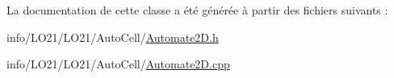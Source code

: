 La documentation de cette classe a été générée à partir des fichiers suivants \+:\begin{DoxyCompactItemize}
\item 
info/\+L\+O21/\+L\+O21/\+Auto\+Cell/\hyperlink{_automate2_d_8h}{Automate2\+D.\+h}\item 
info/\+L\+O21/\+L\+O21/\+Auto\+Cell/\hyperlink{_automate2_d_8cpp}{Automate2\+D.\+cpp}\end{DoxyCompactItemize}
